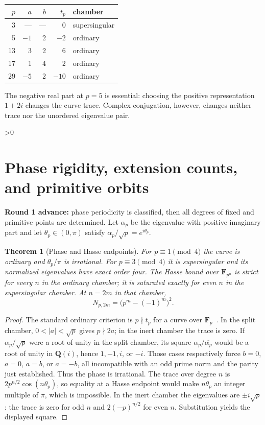 \documentclass[10pt]{article}
\newtheorem{theorem}{Theorem}
\newcommand{\F}{\mathbf F}
\newcommand{\Q}{\mathbf Q}
\begin{document}
\begin{center}
\begin{tabular}{rrrrl}
\toprule
$p$ & $a$ & $b$ & $t_p$ & chamber\\
\midrule
3 & --- & --- & 0 & supersingular\\
5 & $-1$ & 2 & $-2$ & ordinary\\
13 & 3 & 2 & 6 & ordinary\\
17 & 1 & 4 & 2 & ordinary\\
29 & $-5$ & 2 & $-10$ & ordinary\\
\bottomrule
\end{tabular}
\end{center}
The negative real part at $p=5$ is essential: choosing the positive
representation $1+2i$ changes the curve trace. Complex conjugation,
however, changes neither trace nor the unordered eigenvalue pair.

\ifnum\CRevisionRound>0
\section{Phase rigidity, extension counts, and primitive orbits}
\textbf{Round 1 advance:} phase periodicity is classified, then all
degrees of fixed and primitive points are determined. Let
$\alpha_p$ be the eigenvalue with positive imaginary part and let
$\theta_p\in(0,\pi)$ satisfy $\alpha_p/\sqrt p=e^{i\theta_p}$.

\begin{theorem}[Phase and Hasse endpoints]
For $p\equiv1\pmod4$ the curve is ordinary and $\theta_p/\pi$ is
irrational. For $p\equiv3\pmod4$ it is supersingular and its normalized
eigenvalues have exact order four. The Hasse bound over $\F_{p^n}$ is
strict for every $n$ in the ordinary chamber; it is saturated exactly
for even $n$ in the supersingular chamber. At $n=2m$ in that chamber,
\[
 N_{p,2m}=\bigl(p^m-(-1)^m\bigr)^2.
\]
\end{theorem}
\begin{proof}
The standard ordinary criterion is $p\nmid t_p$ for a curve over
$\F_p$~\cite{Silverman}. In the split chamber, $0<|a|<\sqrt p$ gives
$p\nmid2a$; in the inert chamber the trace is zero. If
$\alpha_p/\sqrt p$ were a root of unity in the split chamber, its square
$\alpha_p/\overline{\alpha_p}$ would be a root of unity in $\Q(i)$,
hence $1,-1,i$, or $-i$. Those cases respectively force $b=0$, $a=0$,
$a=b$, or $a=-b$, all incompatible with an odd prime norm and the parity
just established. Thus the phase is irrational. The trace over degree
$n$ is $2p^{n/2}\cos(n\theta_p)$, so equality at a Hasse endpoint
would make $n\theta_p$ an integer multiple of $\pi$, which is
impossible. In the inert chamber the eigenvalues are $\pm i\sqrt p$:
the trace is zero for odd $n$ and $2(-p)^{n/2}$ for even $n$.
Substitution yields the displayed square.
\end{proof}
\end{document}

